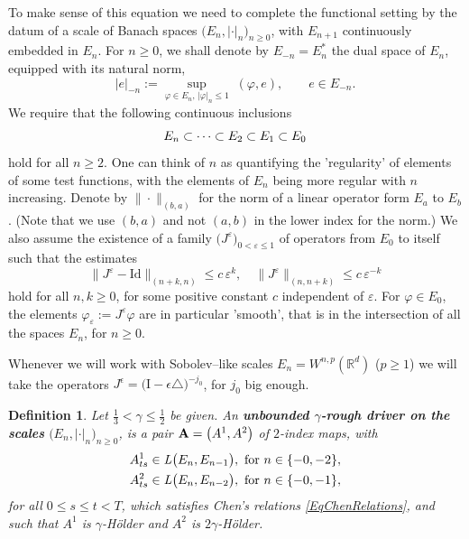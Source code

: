 \documentclass[11pt,a4paper]{amsart}
\newcommand{\RR}{\mathbb{R}}  \newcommand{\CC}{\mathbb{C}}  \newcommand{\LL}{\mathbb{L}}  \newcommand{\WW}{\mathbb{W}}
\newcommand{\ep}{\epsilon}
\renewcommand{\leq}{\leqslant}
\renewcommand{\geq}{\geqslant}
\newcommand{\ssk}{\smallskip}
\newtheorem{defn}[thm]{ \hspace{-0.3cm} {\sc Definition}}%
\numberwithin{equation}{section} %
\begin{document}
To make sense of this equation we need to complete the functional setting by the datum of a scale of Banach spaces $\big(E_n,|\cdot|_n\big)_{n\geq 0}$, with $E_{n+1}$ continuously embedded in $E_n$. For $n\geq 0$, we shall denote by $E_{-n}=E_n^*$ the dual space of $E_n$, equipped with its natural norm, 
$$
|e|_{-n} := \underset{\varphi\in E_n,\,|\varphi|_n\leq 1}{\sup}\; (\varphi,e), \quad\quad e\in E_{-n}.
$$
We require that the following continuous inclusions 
\begin{equation*}
E_n\subset \cdots\subset E_2\subset E_1\subset E_0 \\ 
\end{equation*}
hold for all $n\geq 2$. One can think of $n$ as quantifying the 'regularity' of elements of some test functions, with the elements of $E_n$ being more regular with $n$ increasing. Denote by $\|\cdot\|_{(b,a)}$ for the norm of a linear operator form $E_a$ to $E_b$. (Note that we use $(b,a)$ and not $(a,b)$ in the lower index for the norm.) We also assume the existence of a family $\big(J^\varepsilon\big)_{0<\varepsilon\leq 1}$ of operators from $E_0$ to itself such that the estimates
\begin{equation}
\label{EqApproximationProperties}
\big\|J^\varepsilon - \textrm{Id} \big\|_{(n+k,n)} \leq c\,\varepsilon^k, \quad \big\| J^\varepsilon \big\|_{(n,n + k)} \leq c\,\varepsilon^{- k}
\end{equation}
hold for all $n, k \geq 0$, for some positive constant $c$ independent of $\varepsilon$. For $\varphi\in E_0$, the elements $\varphi_\varepsilon := J^\varepsilon\varphi$ are in particular 'smooth', that is in the intersection of all the spaces $E_n$, for $n\geq 0$. 

Whenever we will work with Sobolev--like scales $E_n = W^{n,p}(\RR^d)$ ($p\ge 1$) we will take the operators $J^\ep = \big(\textrm{I}-\epsilon\triangle\big)^{-j_0}$, for $j_0$ big enough.


\ssk

\begin{defn}
\label{DefnUnboundedRoughDriver}
Let $\frac{1}{3}<\gamma\leq \frac{1}{2}$ be given. An \textbf{\emph{unbounded $\gamma$-rough driver on the scales}} $\big(E_n,|\cdot|_n\big)_{n\geq 0}$, is a pair ${\bf A} = \big(A^1,A^2\big)$ of $2$-index maps, with 
\begin{equation}
\label{EqBoundednessAssumptionRoughDriver}
\begin{split}
&A^1_{ts}\in \textrm{\emph{L}}\big(E_n,E_{n-1}\big), \textrm{ for } n\in\{-0,-2\}, \\
&A^2_{ts}\in\textrm{\emph{L}}\big(E_n,E_{n-2}\big), \textrm{ for } n\in\{-0,-1\},
\end{split}
\end{equation}
for all $0\leq s\leq t<T$, which satisfies Chen's relations \eqref{EqChenRelations}, and such that $A^1$ is $\gamma$-H\"older and $A^2$ is $2\gamma$-H\"older. 
\end{defn}
\end{document}
